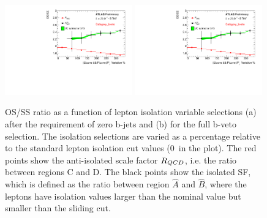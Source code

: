 \begin{figure}[h!]
\begin{center}
\includegraphics[page=1, width=0.49\textwidth]{figure/QCD/qcd_plot.pdf}
\includegraphics[page=2, width=0.49\textwidth]{figure/QCD/qcd_plot.pdf}
\end{center}
	\caption{OS/SS ratio as a function of lepton isolation variable selections (a) after the requirement of zero b-jets and (b) for the full b-veto selection. The isolation selections are varied as a percentage relative to
	the standard lepton isolation cut values (0~in the plot). 
	The red points show the anti-isolated scale factor $R_{QCD}$, i.e. the ratio between regions C and D.
	 The black points show the isolated SF, which is defined as the ratio between region $\hat{A}$ and $\hat{B}$, 
	 where the leptons have isolation values larger than the nominal value but smaller
	 than the sliding cut.
	 }
\end{figure}

